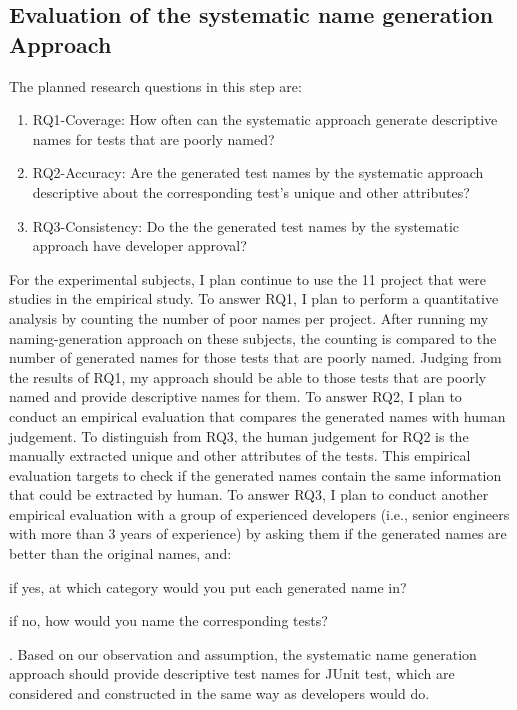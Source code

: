 \subsection{Evaluation of the systematic name generation Approach}

The planned research questions in this step are:
%
\begin{enumerate}
    \item RQ1-Coverage: How often can the systematic approach generate descriptive names for tests that are poorly named?
    \item RQ2-Accuracy: Are the generated test names by the systematic approach descriptive about the corresponding test's unique and other attributes?
    \item RQ3-Consistency: Do the the generated test names by the systematic approach have developer approval?
\end{enumerate}

For the experimental subjects, I plan continue to use the \num{11} project that were studies in the empirical study.
%
To answer RQ1, I plan to perform a quantitative analysis by counting the number of poor names per project.
%
After running my naming-generation approach on these subjects, the counting is compared to the number of generated names for those tests that are poorly named.
%
Judging from the results of RQ1, my approach should be able to those tests that are poorly named and provide descriptive names for them.
%
To answer RQ2, I plan to conduct an empirical evaluation that compares the generated names with human judgement.
%
To distinguish from RQ3, the human judgement for RQ2 is the manually extracted unique and other attributes of the tests.
%
This empirical evaluation targets to check if the generated names contain the same information that could be extracted by human.
%
To answer RQ3, I plan to conduct another empirical evaluation with a group of experienced developers (i.e., senior engineers with more than \num{3} years of experience) by asking them if the generated names are better than the original names, and:
\begin{enumerate*}
    \item if yes, at which category would you put each generated name in?
    \item if no, how would you name the corresponding tests?
\end{enumerate*}.
%
Based on our observation and assumption, the systematic name generation approach should provide descriptive test names for JUnit test, which are considered and constructed in the same way as developers would do. 


